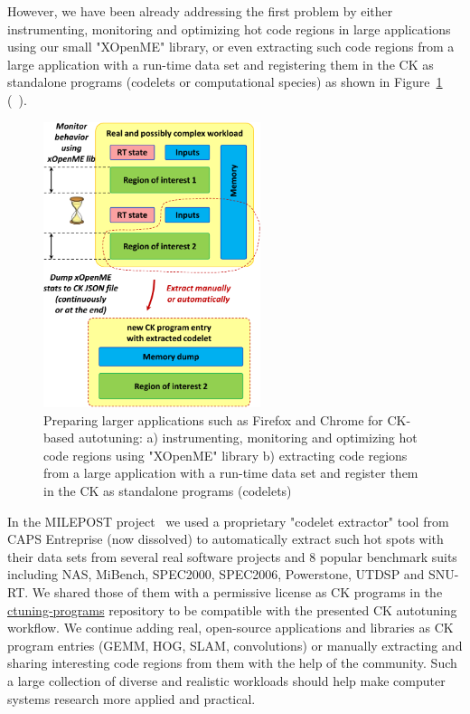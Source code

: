 However, we have been already addressing the first problem by either 
instrumenting, monitoring and optimizing hot code regions in large applications 
using our small "XOpenME" library, or even extracting such code regions 
from a large application with a run-time data set and registering them 
in the CK as standalone programs (codelets or computational species) 
as shown in Figure~\ref{fig:ck-codelets}
(~\cite{fursin:hal-01054763}).

   \begin{figure}[!htbp]
     \centering
      \includegraphics[width=2.5in]
      {ck-assets/1b9b091003515e71-cropped.pdf} %
     \caption{
       Preparing larger applications such as Firefox and Chrome for CK-based autotuning: 
       a) instrumenting, monitoring and optimizing hot code regions using "XOpenME" library 
       b) extracting code regions from a large application with a run-time data set and register them in the CK as standalone programs (codelets)
     }
     \label{fig:ck-codelets}
   \end{figure}

In the MILEPOST project~\cite{29db2248aba45e59:a31e374796869125} 
we used a proprietary "codelet extractor" tool from CAPS Entreprise 
(now dissolved) to automatically extract such hot spots with their data sets 
from several real software projects and 8 popular benchmark suits 
including NAS, MiBench, SPEC2000, SPEC2006, Powerstone, UTDSP and SNU-RT.
%
We shared those of them with a permissive license as CK programs 
in the \href{https://github.com/ctuning/ctuning-programs}{ctuning-programs} repository
to be compatible with the presented CK autotuning workflow.
%           
We continue adding real, open-source applications and libraries as CK program entries
(GEMM, HOG, SLAM, convolutions) or manually extracting and sharing interesting code 
regions from them with the help of the community.
%
Such a large collection of diverse and realistic workloads 
should help make computer systems research more applied and practical.

